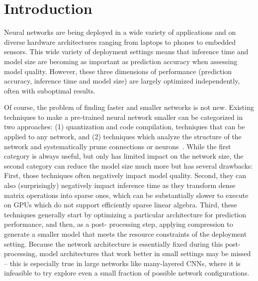 
\section{Introduction}

Neural networks are being deployed in a wide variety of
applications and on diverse hardware architectures ranging from laptops to
phones to embedded sensors. This wide variety of deployment settings means
that inference time and model size are becoming as important as  prediction
accuracy when assessing model quality.  However, these three dimensions of
performance (prediction accuracy, inference time and model size) are largely
optimized independently, often with suboptimal results.

Of course, the problem of finding faster and smaller networks is not new.
Existing techniques to make a pre-trained neural network smaller can be
categorized in two approaches: (1) quantization \cite{Jouppi:2017:IPA:3079856.3080246} and code
compilation, techniques that can be applied  to
any network, and (2) techniques which analyze the structure of the network and
systematically prune connections or neurons~\cite{han2015deepcompression,Cun}. 
While the first category is always useful, but only
has limited impact on the network size, the second category can reduce the model
size much more but has several drawbacks:   First, those techniques often
negatively impact model quality.  Second, they can also (surprisingly) negatively
impact inference time as they transform dense matrix operations into sparse
ones, which can be substantially slower to execute on GPUs which do not support
efficiently sparse linear algebra\cite{han2015deepcompression}. 
Third, these techniques generally start by optimizing a
particular architecture for prediction performance, and then, as a post-
processing step, applying compression  to generate a smaller model that meets
the resource constraints of the deployment setting.  Because the network
architecture is essentially fixed during this post-processing,   model
architectures that work better in small settings may be missed -- this is
especially true in large networks like many-layered CNNs,  where it is
infeasible to try explore even a small fraction of possible network
configurations.


